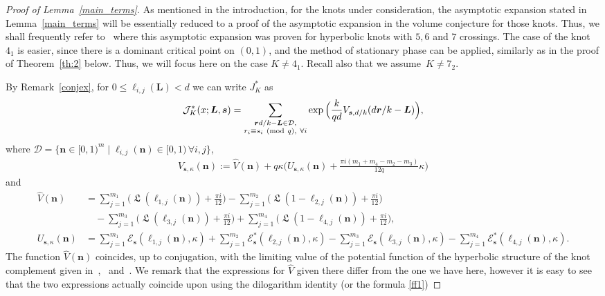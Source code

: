 \documentclass[11pt]{amsart}
\newcommand{\br}{{\boldsymbol r}}
\newcommand{\J}{\mathcal{J}}
\renewcommand{\mod}[1]{~\pr{\textnormal{mod}~#1}}
\newcommand{\Er}{{\mathcal E}}
\theoremstyle{definition}
\newcommand{\ssum}[1]{\sum_{\substack{#1}}}
\newcommand{\pr}[1]{\mathchoice{\left( #1\right)}{(#1)}{(#1)}{(#1)}}
\DeclareMathOperator{\Lie}{{\mathfrak L}}
\newcommand{\bs}{\boldsymbol }
\newcommand{\1}{{\mathbf 1}}
\let\originalleft\left
\let\originalright\right
\renewcommand{\left}{\mathopen{}\mathclose\bgroup\originalleft}
\renewcommand{\right}{\aftergroup\egroup\originalright}
\numberwithin{equation}{section}
\begin{document}
\begin{proof}[Proof of Lemma~\ref{main_terms}]
  As mentioned in the introduction, for the knots under consideration, the asymptotic expansion stated in Lemma~\ref{main_terms} will be essentially reduced to a proof of the asymptotic expansion in the volume conjecture for those knots. Thus, we shall frequently refer to~\cite{Ohtsuki52,OhtsukiYokota6,Ohtsuki7} where this asymptotic expansion was proven for hyperbolic knots with $5,6$ and $7$ crossings. The case of the knot $4_1$ is easier, since there is a dominant critical point on $(0,1)$, and the method of stationary phase can be applied, similarly as in the proof of Theorem~\ref{th:2} below. Thus, we will focus here on the case $K\neq 4_1$. Recall also that we assume~$K\neq 7_2$.

  By Remark~\ref{conjex}, for $0\leq \ell_{i,j}(\bs L)<d$ we can write $J^{*}_K$ as
  \begin{align*}
    \J^{*}_K(x ; \boldsymbol L,\boldsymbol s) =   \ssum{ \br d/k-\bs L\in \mathcal  D,\\  r_i\equiv s_i \mod{q},\ \forall i}
    \exp\Big(\frac{k}{qd}  V_{\bs s,d/k}(d\br/k -\bs L )\Big),
  \end{align*}
  where $\mathcal D=\{\bs n\in [0,1)^m\mid \ell_{i,j}(\bs n)\in[0,1)\, \forall i,j\}$,
  \begin{align*}
    V_{\bs s,\kappa}(\bs n):=\hat V(\bs n)+q\kappa \Big(U_{\bs s,\kappa}(\bs n)+\frac{ \pi i(m_1+m_4-m_2-m_3)}{12q}\kappa\Big)
  \end{align*}
  and
  \begin{align*}
    \hat V(\bs n)&=\sum_{j=1}^{m_1}\Big(\Lie(\ell_{1,j}(\bs n))+\frac{\pi i}{12}\Big) -\sum_{j=1}^{m_2}\Big(\Lie(1-\ell_{2,j}(\bs n))+\frac{\pi i}{12}\Big) \\
    &\quad-\sum_{j=1}^{m_3}\Big(\Lie(\ell_{3,j}(\bs n))+\frac{\pi i}{12}\Big)+\sum_{j=1}^{m_4}\Big(\Lie(1-\ell_{4,j}(\bs n))+\frac{\pi i}{12}\Big),\\
    U_{\bs s,\kappa}(\bs n)&= \sum_{j=1}^{m_1}\Er_{\bs s}(\ell_{1,j}(\bs n),\kappa)+\sum_{j=1}^{m_2}\Er_{\bs s}^*(\ell_{2,j}(\bs n),\kappa)-\sum_{j=1}^{m_3}\Er_{\bs s}(\ell_{3,j}(\bs n),\kappa)-\sum_{j=1}^{m_4}\Er_{\bs s}^*(\ell_{4,j}(\bs n),\kappa).
  \end{align*}
  The function $\hat V(\bs n)$ coincides, up to conjugation, with the limiting value of the potential function of the hyperbolic structure of the knot complement given in~\cite[(10)]{Ohtsuki52},~\cite[p.297, p.308, p.322]{OhtsukiYokota6} and~\cite[p.12, p.26, p.38, p.50, p.63]{Ohtsuki7}. We remark that the expressions for $\hat V$ given there differ from the one we have here, however it is easy to see that the two expressions actually coincide upon using the dilogarithm identity (or the formula \eqref{ff1})

\end{proof}
\end{document}
